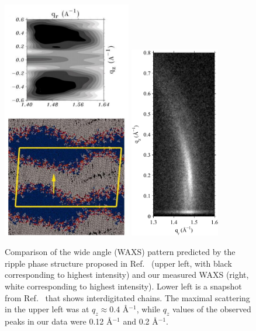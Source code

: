 \begin{figure}[htbp]
  \centering
  \includegraphics[width=0.5\textwidth]{figures/ripple/discussion/deVries_waxs}
  \qquad
  \includegraphics[width=0.35\textwidth]{figures/ripple/discussion/ripple_waxs}
  \caption{Comparison of the wide angle (WAXS) pattern predicted by the 
  ripple phase structure proposed in Ref.~\cite{ref:deVries05} 
  (upper left, with black corresponding to highest intensity) and
  our measured WAXS (right, white corresponding to highest intensity). 
  Lower left is a snapshot from Ref.~\cite{ref:deVries05} that shows 
  interdigitated chains.  The maximal scattering in the upper left  was at 
  $q_z \approx 0.4$ \AA$^{-1}$,
  while $q_z$ values of the observed peaks in our data were 0.12 \AA$^{-1}$
  and 0.2 \AA$^{-1}$.}
  \label{fig:nGIWAXS_comparison}
\end{figure}


